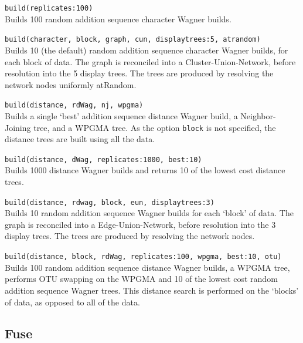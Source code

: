 	\begin{example}
		\item{\texttt{build(replicates:100)} \\
		Builds 100 random addition sequence character Wagner builds.}
		
		\item{\texttt{build(character, block, graph, cun, displaytrees:5, atrandom)}\\
		Builds 10 (the default) random addition sequence character Wagner builds, for each 
		block of data. The graph is reconciled into a Cluster-Union-Network, before resolution 
		into the 5 display trees. The trees are produced by resolving the network nodes 
		uniformly atRandom.}
		
		\item{\texttt{build(distance, rdWag, nj, wpgma)} \\ 
		Builds a single `best' addition sequence distance Wagner build, a Neighbor-Joining tree, 
		and a WPGMA tree. As the option \texttt{block} is not specified, the distance trees are 
		built using all the data.}
		
		\item{\texttt{build(distance, dWag, replicates:1000, best:10)}\\
		Builds 1000 distance Wagner builds and returns 10 of the lowest cost distance trees.}
	
		\item{\texttt{build(distance, rdwag, block, eun, displaytrees:3)}\\
		Builds 10 random addition sequence Wagner builds for each `block' of data. The graph 
		is reconciled into a Edge-Union-Network, before resolution into the 3 display trees. 
		The trees are produced by resolving the network nodes.}
		
		\item{\texttt{build(distance, block, rdWag, replicates:100, wpgma, best:10, otu)}\\
		Builds 100 random addition sequence distance Wagner builds, a WPGMA tree, 
		performs OTU swapping on the WPGMA and 10 of the lowest cost random addition 
		sequence Wagner trees. This distance search is performed on the `blocks' of data, 
		as opposed to all of the data.}
	\end{example}

\subsection{Fuse}
